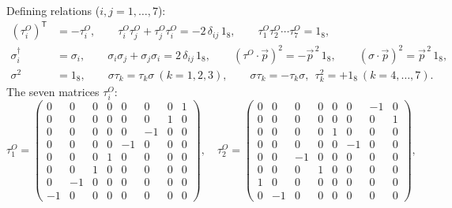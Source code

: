 \documentclass[10pt,a4paper]{article}
\begin{document}
Defining relations ($i,j=1,\dots,7$):
\begin{align*}
(\tau^{O}_i)^{\mathsf T}&=-\tau^{O}_i,\qquad \tau^{O}_i\tau^{O}_j+\tau^{O}_j\tau^{O}_i=-2\,\delta_{ij}\,1_8,\qquad \tau^{O}_1\tau^{O}_2\cdots\tau^{O}_7=1_8, \\
\sigma_i^\dagger&=\sigma_i,\qquad \sigma_i\sigma_j+\sigma_j\sigma_i=2\,\delta_{ij}\,1_8,\qquad (\tau^{O}\cdot\vec p)^2=-\vec p^{\,2}\,1_8,\qquad (\sigma\cdot\vec p)^2=\vec p^{\,2}\,1_8, \\
\sigma^2&=1_8,\qquad \sigma\tau_k=\tau_k\sigma\ (k=1,2,3),\qquad \sigma\tau_k=-\tau_k\sigma,\ \ \tau_k^2=+1_8\ (k=4,\dots,7).
\end{align*}
The seven matrices $\tau^{O}_i$:
\begin{equation*}
\tau^{O}_1=\begin{pmatrix}0 & 0 & 0 & 0 & 0 & 0 & 0 & 1 \\ 0 & 0 & 0 & 0 & 0 & 0 & 1 & 0 \\ 0 & 0 & 0 & 0 & 0 & -1 & 0 & 0 \\ 0 & 0 & 0 & 0 & -1 & 0 & 0 & 0 \\ 0 & 0 & 0 & 1 & 0 & 0 & 0 & 0 \\ 0 & 0 & 1 & 0 & 0 & 0 & 0 & 0 \\ 0 & -1 & 0 & 0 & 0 & 0 & 0 & 0 \\ -1 & 0 & 0 & 0 & 0 & 0 & 0 & 0\end{pmatrix},\quad \tau^{O}_2=\begin{pmatrix}0 & 0 & 0 & 0 & 0 & 0 & -1 & 0 \\ 0 & 0 & 0 & 0 & 0 & 0 & 0 & 1 \\ 0 & 0 & 0 & 0 & 1 & 0 & 0 & 0 \\ 0 & 0 & 0 & 0 & 0 & -1 & 0 & 0 \\ 0 & 0 & -1 & 0 & 0 & 0 & 0 & 0 \\ 0 & 0 & 0 & 1 & 0 & 0 & 0 & 0 \\ 1 & 0 & 0 & 0 & 0 & 0 & 0 & 0 \\ 0 & -1 & 0 & 0 & 0 & 0 & 0 & 0\end{pmatrix},
\end{equation*}
\end{document}
